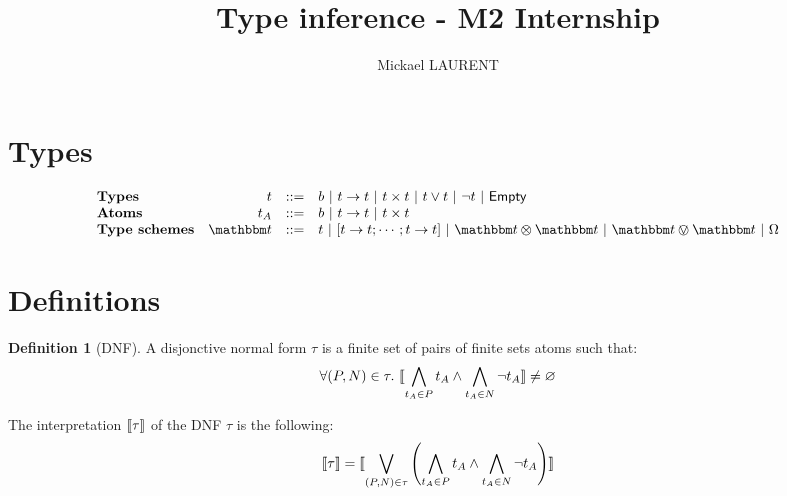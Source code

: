 \documentclass[a4paper]{article}
\title{\vspace{1.5cm}Type inference - M2 Internship}
\author{Mickael LAURENT}
\date{\vspace{-5ex}}
\theoremstyle{definition}
\newtheorem{definition}{Definition}
\begin{document}
  \maketitle
  
    \section{Types}

    \[
        \begin{array}{lrcl}
        \textbf{Types} & t & ::= & b\alt \arrow t t\alt \pair t t\alt t\vee t \alt \neg t \alt \Empty\\
        \textbf{Atoms} & t_A & ::= & b\alt \arrow t t\alt \pair t t\\
        \textbf{Type schemes} & \ts & ::= & t \alt \tsfun {\arrow t t ; \cdots ; \arrow t t} \alt \ts \tstimes \ts \alt \ts \tsor \ts \alt \tsempty
        \end{array}
    \]

    \section{Definitions}

    \begin{definition}[DNF]
      A disjonctive normal form $\tau$ is a finite set of pairs of finite sets atoms such that:
      \[ \forall (P,N)\in \tau.\ {\llbracket \bigwedge_{t_A \in P} t_A \land \bigwedge_{t_A \in N} \neg t_A \rrbracket} \neq \varnothing \]

      The interpretation ${\llbracket \tau \rrbracket}$ of the DNF $\tau$ is the following:
      \[
        {\llbracket \tau \rrbracket} = {\llbracket \bigvee_{(P,N)\in \tau} \left(\bigwedge_{t_A \in P} t_A \land \bigwedge_{t_A \in N} \neg t_A \right) \rrbracket}
      \]
    \end{definition}
\end{document}
